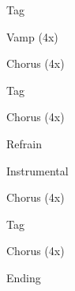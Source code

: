 \documentclass{nnschart}
\begin{document}
\begin{section}{Tag}
\end{section}

\begin{section}{Vamp (4x)}
\end{section}

\begin{section}{Chorus (4x)}
\end{section}

\begin{section}{Tag}
\end{section}

\begin{section}{Chorus (4x)}
\end{section}

\begin{section}{Refrain}
\end{section}

\begin{section}{Instrumental}
\end{section}

\begin{section}{Chorus (4x)}
\end{section}

\begin{section}{Tag}
\end{section}

\begin{section}{Chorus (4x)}
\end{section}

\begin{section}{Ending}
\end{section}
\end{document}
